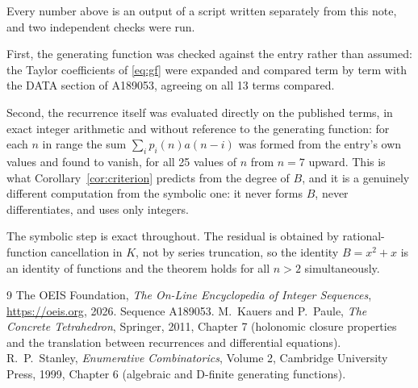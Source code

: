 \documentclass[11pt,a4paper]{article}
\theoremstyle{plain}
\theoremstyle{definition}
\begin{document}
Every number above is an output of a script written separately from this note, and two
independent checks were run.

First, the generating function was checked against the entry rather than assumed: the
Taylor coefficients of \eqref{eq:gf} were expanded and compared term by term with the DATA
section of A189053, agreeing on all 13 terms compared.

Second, the recurrence itself was evaluated directly on the published terms, in exact
integer arithmetic and without reference to the generating function: for each $n$ in range
the sum $\sum_{i}p_{i}(n)a(n-i)$ was formed from the entry's own values and found to
vanish, for all 25 values of $n$ from $n=7$ upward. This is what
Corollary~\ref{cor:criterion} predicts from the degree of $B$, and it is a genuinely
different computation from the symbolic one: it never forms $B$, never differentiates, and
uses only integers.

The symbolic step is exact throughout. The residual is obtained by rational-function
cancellation in $K$, not by series truncation, so the identity $B=x^{2} + x$ is an
identity of functions and the theorem holds for all $n>2$ simultaneously.

\begin{thebibliography}{9}
 The OEIS Foundation, \emph{The On-Line Encyclopedia of Integer Sequences},
\url{https://oeis.org}, 2026. Sequence A189053.
 M.~Kauers and P.~Paule, \emph{The Concrete Tetrahedron}, Springer, 2011,
Chapter 7 (holonomic closure properties and the translation between recurrences and
differential equations).
 R.~P.~Stanley, \emph{Enumerative Combinatorics}, Volume 2, Cambridge
University Press, 1999, Chapter 6 (algebraic and D-finite generating functions).
\end{thebibliography}
\end{document}
